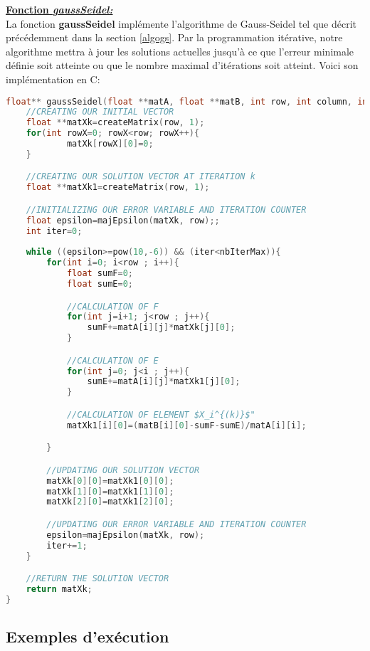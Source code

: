 \documentclass{report}
\begin{document}
\textbf{\underline{Fonction \textit{gaussSeidel:}}}\vspace{6pt}\\
La fonction \textbf{gaussSeidel} implémente l'algorithme de Gauss-Seidel tel que décrit précédemment dans la section \ref{algogs}. Par la programmation itérative, notre algorithme mettra à jour les solutions actuelles jusqu'à ce que l'erreur minimale définie soit atteinte ou que le nombre maximal d'itérations soit atteint. Voici son implémentation en C:
\begin{lstlisting}[mathescape=true, language=C,inputencoding=utf8, basicstyle=\fontsize{8}{10}\selectfont]
  float** gaussSeidel(float **matA, float **matB, int row, int column, int nbIterMax){
    //CREATING OUR INITIAL VECTOR
    float **matXk=createMatrix(row, 1);
    for(int rowX=0; rowX<row; rowX++){
			matXk[rowX][0]=0;
    }

    //CREATING OUR SOLUTION VECTOR AT ITERATION k
    float **matXk1=createMatrix(row, 1);

    //INITIALIZING OUR ERROR VARIABLE AND ITERATION COUNTER
    float epsilon=majEpsilon(matXk, row);;
    int iter=0;
    
    while ((epsilon>=pow(10,-6)) && (iter<nbIterMax)){
        for(int i=0; i<row ; i++){
            float sumF=0;
            float sumE=0;

            //CALCULATION OF F
            for(int j=i+1; j<row ; j++){
                sumF+=matA[i][j]*matXk[j][0];
            }

            //CALCULATION OF E
            for(int j=0; j<i ; j++){
                sumE+=matA[i][j]*matXk1[j][0];
            }

            //CALCULATION OF ELEMENT $X_i^{(k)}$"
            matXk1[i][0]=(matB[i][0]-sumF-sumE)/matA[i][i];

        }

        //UPDATING OUR SOLUTION VECTOR
        matXk[0][0]=matXk1[0][0];
        matXk[1][0]=matXk1[1][0];
        matXk[2][0]=matXk1[2][0];

        //UPDATING OUR ERROR VARIABLE AND ITERATION COUNTER
        epsilon=majEpsilon(matXk, row);
        iter+=1;
    }

    //RETURN THE SOLUTION VECTOR
    return matXk;
}
\end{lstlisting}
\subsection{Exemples d'exécution}
\end{document}
